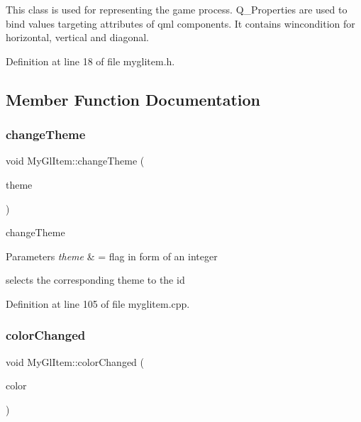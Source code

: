 This class is used for representing the game process. Q\+\_\+\+Properties are used to bind values targeting attributes of qml components. It contains wincondition for horizontal, vertical and diagonal. 

Definition at line 18 of file myglitem.\+h.



\subsection{Member Function Documentation}
\mbox{\label{class_my_gl_item_a613c4a856e605fffbcf0968f821e8823}} 
\subsubsection{\texorpdfstring{changeTheme}{changeTheme}}
{\footnotesize\ttfamily void My\+Gl\+Item\+::change\+Theme (\begin{DoxyParamCaption}\item[{int}]{theme }\end{DoxyParamCaption})\hspace{0.3cm}{\ttfamily [slot]}}



change\+Theme 


\begin{DoxyParams}{Parameters}
{\em theme} & = flag in form of an integer\\
\hline
\end{DoxyParams}
selects the corresponding theme to the id 

Definition at line 105 of file myglitem.\+cpp.

\mbox{\label{class_my_gl_item_a7bab02e6f11d653e97b328a953d81c82}} 
\subsubsection{\texorpdfstring{colorChanged}{colorChanged}}
{\footnotesize\ttfamily void My\+Gl\+Item\+::color\+Changed (\begin{DoxyParamCaption}\item[{Q\+String}]{color }\end{DoxyParamCaption})\hspace{0.3cm}{\ttfamily [signal]}}



